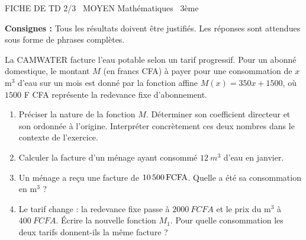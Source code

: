\documentclass[11pt]{article}
\begin{document}
\begin{tcolorbox}[enhanced,colback=popink,colframe=popink,arc=10pt,boxrule=0pt,left=12pt,right=12pt,top=9pt,bottom=9pt]
{\color{white}\popxbold\small FICHE DE TD 2/3 \textbullet\ MOYEN \hfill Mathématiques \textbullet\ 3ème\par}
\end{tcolorbox}
\vspace{4pt}
\noindent\textbf{Consignes :} Tous les résultats doivent être justifiés. Les réponses sont attendues sous forme de phrases complètes.

\begin{exercice}
La CAMWATER facture l'eau potable selon un tarif progressif. Pour un abonné domestique, le montant $M$ (en francs CFA) à payer pour une consommation de $x$ m$^3$ d'eau sur un mois est donné par la fonction affine $M(x) = 350x + 1500$, où $1500$ F CFA représente la redevance fixe d'abonnement.
\begin{enumerate}
    \item Préciser la nature de la fonction $M$. Déterminer son coefficient directeur et son ordonnée à l'origine. Interpréter concrètement ces deux nombres dans le contexte de l'exercice.
    \item Calculer la facture d'un ménage ayant consommé $\SI{12}{m^3}$ d'eau en janvier.
    \item Un ménage a reçu une facture de $\SI{10\,500}{F CFA}$. Quelle a été sa consommation en m$^3$ ?
    \item Le tarif change : la redevance fixe passe à $\SI{2000}{F CFA}$ et le prix du m$^3$ à $\SI{400}{F CFA}$. Écrire la nouvelle fonction $M_1$. Pour quelle consommation les deux tarifs donnent-ils la même facture ?
\end{enumerate}
\end{exercice}
\end{document}
